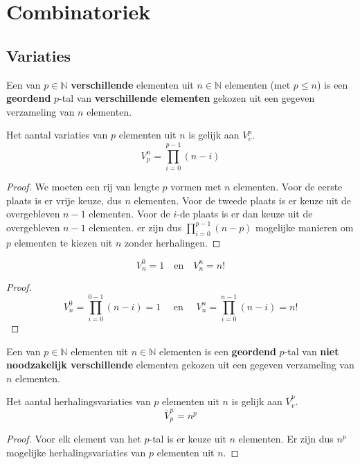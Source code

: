 \documentclass[main.tex]{subfiles}
\begin{document}
\chapter{Combinatoriek}
\label{cha:combinatoriek}


\section{Variaties}
\label{sec:variaties}

\begin{de}
  Een  van $p\in \mathbb{N}$ \textbf{verschillende} elementen uit $n\in \mathbb{N}$ elementen (met $p \le n$) is een \textbf{geordend} $p$-tal van \textbf{verschillende elementen} gekozen uit een gegeven verzameling van $n$ elementen.    
\end{de}

\begin{st}
  Het aantal variaties van $p$ elementen uit $n$ is gelijk aan $V_{v}^{p}$.
  \[
  V_{p}^{n} = \prod_{i=0}^{p-1}(n-i)
  \]

  \begin{proof}
    We moeten een rij van lengte $p$ vormen met $n$ elementen.
    Voor de eerste plaats is er vrije keuze, dus $n$ elementen.
    Voor de tweede plaats is er keuze uit de overgebleven $n-1$ elementen.
    Voor de $i$-de plaats is er dan keuze uit de overgebleven $n-1$ elementen.
    er zijn dus $\prod_{i=0}^{p-1}(n-p)$ mogelijke manieren om $p$ elementen te kiezen uit $n$ zonder herhalingen.
  \end{proof}
\end{st}

\begin{ei}
  \[ V_{n}^{0} = 1 \quad\text{en}\quad V_{n}^{n} = n! \]

  \begin{proof}
    \[ V_{n}^{0} = \prod_{i=0}^{0-1}(n-i) = 1 \quad\text{ en }\quad V_{n}^{n} = \prod_{i=0}^{n-1}(n-i) = n!\]
  \end{proof}
\end{ei}

\begin{de}
  Een  van $p\in \mathbb{N}$ elementen uit $n\in \mathbb{N}$ elementen is een \textbf{geordend} $p$-tal van \textbf{niet noodzakelijk verschillende} elementen gekozen uit een gegeven verzameling van $n$ elementen.  
\end{de}

\begin{st}
  Het aantal herhalingsvariaties van $p$ elementen uit $n$ is gelijk aan $\overline{V}_{v}^{p}$.
  \[
  \overline{V}_{p}^{n} = n^{p}
  \]

  \begin{proof}
    Voor elk element van het $p$-tal is er keuze uit $n$ elementen. 
    Er zijn dus $n^{p}$ mogelijke herhalingsvariaties van $p$ elementen uit $n$.
  \end{proof}
\end{st}
\end{document}
